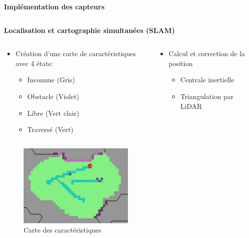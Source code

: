 \documentclass[aspectratio=169,10pt]{beamer}
\begin{document}
\begin{frame}{\textbf{Implémentation des capteurs}}
\begin{columns}
\begin{column}{0.5\textwidth}
		\end{column}
	\end{columns}
\end{frame}


\begin{frame}{\textbf{Localisation et cartographie simultanées (SLAM)}}
	\begin{columns}[t]
		\begin{column}{0.5\textwidth}
			\begin{itemize}
				\item Création d'une carte de caractéristiques avec 4 états:
				\begin{itemize}
					\item Inconnue (Gris)
					\item Obstacle (Violet)
					\item Libre (Vert clair)
					\item Traversé (Vert)
				\end{itemize}				
			\end{itemize}
		\end{column}
		\begin{column}{0.5\textwidth}
			\begin{itemize}
			\item Calcul et correction de la position
				\begin{itemize}
					\item Centrale inertielle
					\item Triangulation par LiDAR
				\end{itemize}
			\end{itemize}
		\end{column}
	\end{columns}
	\begin{columns}[t]
		\begin{column}{0.5\textwidth}
			\begin{figure}
				\centering
				\includegraphics[width=0.5\textwidth]{IMAGES/lgm_t3_c.png}
				\caption{Carte des caractéristiques}
			\end{figure}

\end{column}
\end{columns}
\end{frame}
\end{document}

